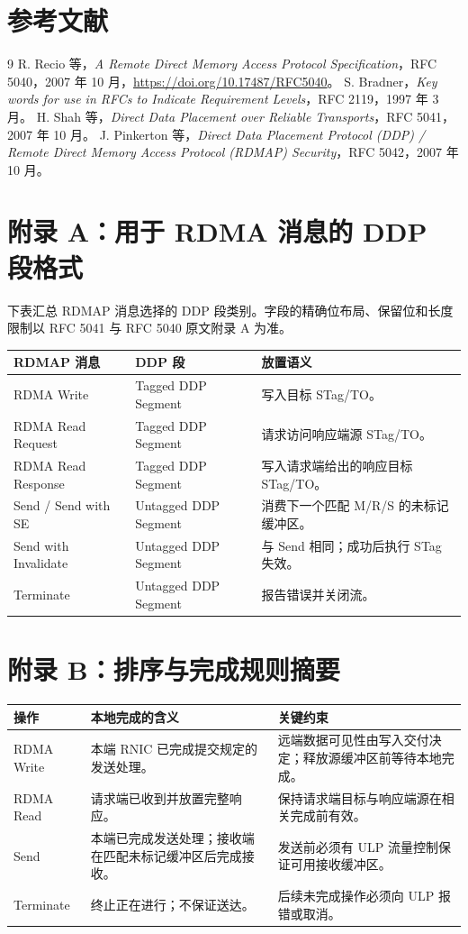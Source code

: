\documentclass[11pt,a4paper]{article}
\begin{document}
\section{参考文献}
\begin{thebibliography}{9}
 R. Recio 等，\emph{A Remote Direct Memory Access Protocol Specification}，RFC 5040，2007 年 10 月，\url{https://doi.org/10.17487/RFC5040}。
 S. Bradner，\emph{Key words for use in RFCs to Indicate Requirement Levels}，RFC 2119，1997 年 3 月。
 H. Shah 等，\emph{Direct Data Placement over Reliable Transports}，RFC 5041，2007 年 10 月。
 J. Pinkerton 等，\emph{Direct Data Placement Protocol (DDP) / Remote Direct Memory Access Protocol (RDMAP) Security}，RFC 5042，2007 年 10 月。
\end{thebibliography}
\appendix
\section{附录 A：用于 RDMA 消息的 DDP 段格式}
下表汇总 RDMAP 消息选择的 DDP 段类别。字段的精确位布局、保留位和长度限制以 RFC 5041 与 RFC 5040 原文附录 A 为准。
\begin{longtable}{p{.31\linewidth}p{.28\linewidth}p{.31\linewidth}}
\toprule RDMAP 消息 & DDP 段 & 放置语义\\\midrule\endhead
RDMA Write & Tagged DDP Segment & 写入目标 STag/TO。\\
RDMA Read Request & Tagged DDP Segment & 请求访问响应端源 STag/TO。\\
RDMA Read Response & Tagged DDP Segment & 写入请求端给出的响应目标 STag/TO。\\
Send / Send with SE & Untagged DDP Segment & 消费下一个匹配 M/R/S 的未标记缓冲区。\\
Send with Invalidate & Untagged DDP Segment & 与 Send 相同；成功后执行 STag 失效。\\
Terminate & Untagged DDP Segment & 报告错误并关闭流。\\
\bottomrule
\end{longtable}
\section{附录 B：排序与完成规则摘要}
\begin{longtable}{p{.27\linewidth}p{.31\linewidth}p{.31\linewidth}}
\toprule 操作 & 本地完成的含义 & 关键约束\\\midrule\endhead
RDMA Write & 本端 RNIC 已完成提交规定的发送处理。 & 远端数据可见性由写入交付决定；释放源缓冲区前等待本地完成。\\
RDMA Read & 请求端已收到并放置完整响应。 & 保持请求端目标与响应端源在相关完成前有效。\\
Send & 本端已完成发送处理；接收端在匹配未标记缓冲区后完成接收。 & 发送前必须有 ULP 流量控制保证可用接收缓冲区。\\
Terminate & 终止正在进行；不保证送达。 & 后续未完成操作必须向 ULP 报错或取消。\\
\bottomrule
\end{longtable}
\end{document}
